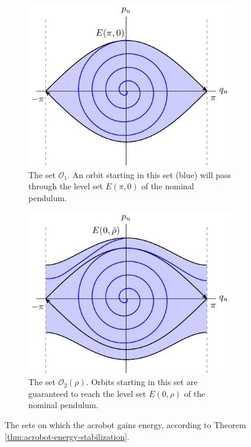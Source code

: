\documentclass[journal,twoside,web, twocolumn,draftcls]{ieeecolor}
\begin{document}
\begin{figure}
    \centering
    \begin{subfigure}[t]{0.45\linewidth}
        \includegraphics[width=\linewidth]{acrobot_oscillation_domain.pdf}
        \caption{The set \(\mathcal{O}_1\). An orbit starting in this set (blue)
            will pass through the level set \(E(\pi,0)\) of the nominal pendulum.}
        \label{fig:acrobot-oscillation-domain}
    \end{subfigure}
    \hfill
    \begin{subfigure}[t]{0.45\linewidth}
        \includegraphics[width=\linewidth]{acrobot_omega.pdf}
        \caption{The set \(\mathcal{O}_2(\rho)\). Orbits starting in this
            set are guaranteed to reach the level set \(E(0,\rho)\) of the
            nominal pendulum.}
            \label{fig:acrobot-o2}
    \end{subfigure}
    \caption{The sets on which the acrobot gains energy, according to
        Theorem \ref{thm:acrobot-energy-stabilization}.}
\end{figure}
\end{document}

